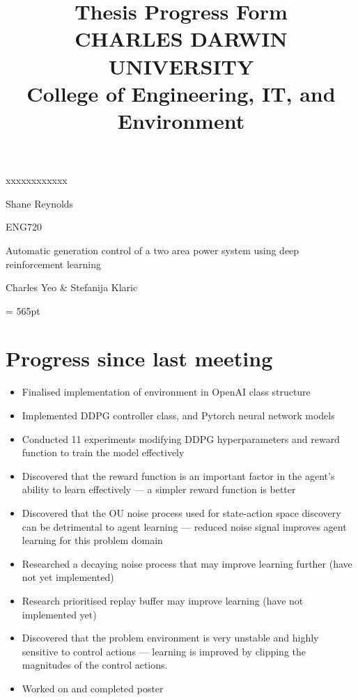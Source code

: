 \documentclass[12pt]{article}
\title{	
		Thesis Progress Form\\
		CHARLES DARWIN UNIVERSITY\\
		College of Engineering, IT, and Environment
	  }
\author{}
\date{}
\begin{document}
	
	\maketitle
	
	\begin{namelist}{xxxxxxxxxxxx}
		\item[{\bf Name:}]
			Shane Reynolds
		\item[{\bf Unit:}]
			ENG720
		\item[{\bf Title:}]
			Automatic generation control of a two area power system using deep reinforcement learning
		\item[{\bf Supervisors:}]
			Charles Yeo \& Stefanija Klaric
		\item[{\bf Time \& Date:} \today \ @ 11am]
			
	\end{namelist}
	
	\pagestyle{plain} %
	\textheight = 565pt %
	
	\section{Progress since last meeting}
	\begin{itemize}
		\item Finalised implementation of environment in OpenAI class structure
		\item Implemented DDPG controller class, and Pytorch neural network models
		\item Conducted 11 experiments modifying DDPG hyperparameters and reward function to train the model effectively
		\item Discovered that the reward function is an important factor in the agent's ability to learn effectively --- a simpler reward function is better
		\item Discovered that the OU noise process used for state-action space discovery can be detrimental to agent learning --- reduced noise signal improves agent learning for this problem domain
		\item Researched a decaying noise process that may improve learning further (have not yet implemented)
		\item Research prioritised replay buffer may improve learning (have not implemented yet)
		\item Discovered that the problem environment is very unstable and highly sensitive to control actions --- learning is improved by clipping the magnitudes of the control actions.
		\item Worked on and completed poster
	\end{itemize}
\end{document}
